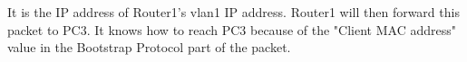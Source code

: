 It is the IP address of Router1's vlan1 IP address. Router1 will then forward this packet to PC3. It knows how to reach PC3 because of the "Client MAC address" value in the Bootstrap Protocol part of the packet.
